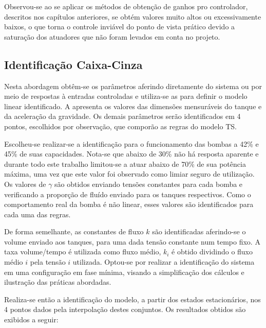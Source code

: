 Observou-se ao se aplicar os métodos de obtenção de ganhos pro controlador, descritos nos capítulos anteriores, se obtém valores muito altos ou excessivamente baixos, o que torna o controle inviável do ponto de vista prático devido a saturação dos atuadores que não foram levados em conta no projeto.

\subsection{Identificação Caixa-Cinza}

Nesta abordagem obtêm-se os parâmetros aferindo diretamente do sistema ou por meio de respostas à entradas controladas e utiliza-se as  para definir o modelo linear identificado. A  apresenta os valores das dimensões mensuráveis do tanque e da aceleração da gravidade. Os demais parâmetros serão identificados em 4 pontos, escolhidos por observação, que comporão as regras do modelo TS. 

Escolheu-se realizar-se a identificação para o funcionamento das bombas a 42\% e 45\% de suas capacidades. Nota-se que abaixo de 30\% não há resposta aparente e durante todo este trabalho limitou-se a atuar abaixo de 70\% de sua potência máxima, uma vez que este valor foi observado como limiar seguro de utilização. Os valores de $\gamma$ são obtidos enviando tensões constantes para cada bomba e verificando a proporção de fluído enviado para os tanques respectivos. Como o comportamento real da bomba é não linear, esses valores são identificados para cada uma das regras.

De forma semelhante, as constantes de fluxo $k$ são identificadas aferindo-se o volume enviado aos tanques, para uma dada tensão constante num tempo fixo. A taxa volume/tempo é utilizada como fluxo médio, $k_i$ é obtido dividindo o fluxo médio $i$ pela tensão $i$ utilizada. Optou-se por realizar a identificação do sistema em uma configuração em fase mínima, visando a simplificação dos cálculos e ilustração das práticas abordadas.

\begin{table}[!ht]
	\caption{Tensões Escolhidas}
	\label{tabIdentKs}
	\small
	\centering
\end{table}
Realiza-se então a identificação do modelo, a partir dos estados estacionários, nos 4 pontos dados pela interpolação destes conjuntos. Os resultados obtidos são exibidos a seguir:

